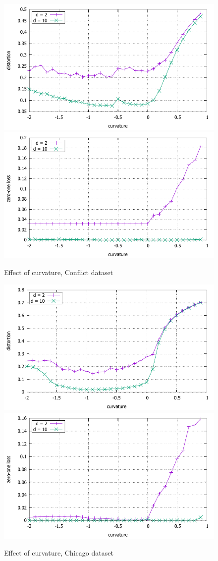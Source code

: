 \documentclass{article} %
\begin{document}
\begin{figure}
    \centering
    \includegraphics[width = 0.49 \textwidth]{conflict_distortion.pdf}
    \includegraphics[width = 0.49 \textwidth]{conflict_zero_one.pdf}
    \caption{Effect of curvature, Conflict dataset}
    \label{fig:conflict}
\end{figure}

\begin{figure}
    \centering
    \includegraphics[width = 0.49 \textwidth]{chicago_distortion.pdf}
    \includegraphics[width = 0.49 \textwidth]{chicago_zero_one.pdf}
    \caption{Effect of curvature, Chicago dataset}
    \label{fig:chicago}
\end{figure}
\end{document}
